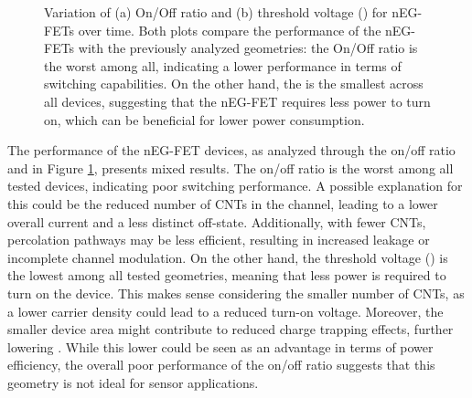 \begin{figure}
    \centering
    \hfill
    \caption{Variation of (a) On/Off ratio and (b) threshold voltage (\vth{}) for nEG-FETs over time. Both plots compare the performance of the nEG-FETs with the previously analyzed geometries: the On/Off ratio is the worst among all, indicating a lower performance in terms of switching capabilities. On the other hand, the \vth{} is the smallest across all devices, suggesting that the nEG-FET requires less power to turn on, which can be beneficial for lower power consumption.}
    \label{fig:avgNParams}
\end{figure}


The performance of the nEG-FET devices, as analyzed through the on/off ratio and \vth{} in Figure \ref{fig:avgNParams}, presents mixed results. The on/off ratio is the worst among all tested devices, indicating poor switching performance. A possible explanation for this could be the reduced number of CNTs in the channel, leading to a lower overall current and a less distinct off-state. Additionally, with fewer CNTs, percolation pathways may be less efficient, resulting in increased leakage or incomplete channel modulation. On the other hand, the threshold voltage (\vth{}) is the lowest among all tested geometries, meaning that less power is required to turn on the device. This makes sense considering the smaller number of CNTs, as a lower carrier density could lead to a reduced turn-on voltage. Moreover, the smaller device area might contribute to reduced charge trapping effects, further lowering \vth{}. While this lower \vth{} could be seen as an advantage in terms of power efficiency, the overall poor performance of the on/off ratio suggests that this geometry is not ideal for sensor applications.
